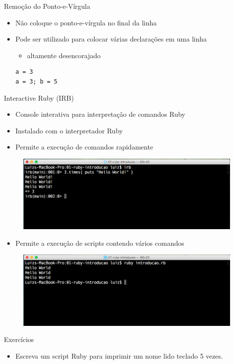 \begin{frame}[fragile,t]{Remoção do Ponto-e-Vírgula}
  \begin{itemize}
    \item \alert{Não} coloque o \alert{ponto-e-vírgula} no final da linha
    \item Pode ser utilizado para colocar várias declarações em uma linha
    \begin{itemize}
      \item altamente \alert{desencorajado}
    \end{itemize}
    \begin{lstlisting}[style=RubyInputStyle]
a = 3	
a = 3; b = 5 
    \end{lstlisting}
  \end{itemize}
\end{frame}
\begin{frame}{Interactive Ruby (IRB)}
  \begin{itemize}
    \item Console \alert{interativa} para interpretação de comandos Ruby
    \item Instalado com o interpretador Ruby
    \item Permite a \alert{execução} de comandos rapidamente
  \end{itemize}
  \begin{figure}[hbt]
    \includegraphics[scale=.35]{imagens/ruby-irb.png}
  \end{figure}
\framebreak
  \begin{itemize}
  	\item Permite a \alert{execução} de \alert{scripts} contendo vários comandos
  \end{itemize}
  \begin{figure}[hbt]
    \includegraphics[scale=.35]{imagens/ruby-interpretador.png}
  \end{figure}
\end{frame}
\begin{frame}[fragile,t]{Exercícios}
  \begin{itemize}
    \item Escreva um script Ruby para imprimir um nome lido teclado 5 vezes.
  \end{itemize}
\end{frame}
